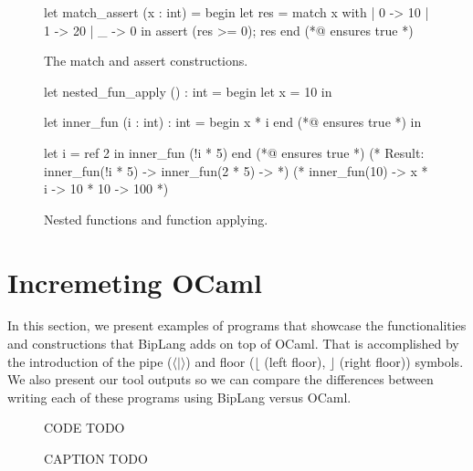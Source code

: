 \begin{figure}
\begin{minipage}{\linewidth}
\begin{biplangenv}
  let match_assert (x : int) = begin
    let res = 
      match x with 
      | 0 -> 10
      | 1 -> 20
      | _ -> 0
    in
    assert (res >= 0);
    res
  end
  (*@ ensures true *) 
\end{biplangenv}
\end{minipage}
\caption{The match and assert constructions.}
\end{figure}

\begin{figure}
\begin{minipage}{\linewidth}
\begin{biplangenv}
  let nested_fun_apply () : int = begin
    let x = 10 in

    let inner_fun (i : int) : int = begin
      x * i 
    end
    (*@ ensures true *)
    in

    let i = ref 2 in
    inner_fun (!i * 5)
  end
  (*@ ensures true *) 
  (* Result: inner_fun(!i * 5) -> inner_fun(2 * 5) -> *)
  (*         inner_fun(10) -> x * i -> 10 * 10 -> 100 *)
\end{biplangenv}
\end{minipage}
\caption{Nested functions and function applying.}
\end{figure}


\section{Incremeting OCaml}
\label{sec:incrementing}

In this section, we present examples of programs that showcase the functionalities and constructions that BipLang adds on top of OCaml.
That is accomplished by the introduction of the pipe (\textbf{$\langle|\rangle$}) and floor (\textbf{$\lfloor$} (left floor), \textbf{$\rfloor$} (right floor)) symbols.
We also present our tool outputs so we can compare the differences between writing each of these programs using BipLang versus OCaml.

\begin{figure}
\begin{minipage}{\linewidth}
\begin{biplangenv}
  CODE TODO
\end{biplangenv}
\end{minipage}
\caption{CAPTION TODO}
\end{figure}



